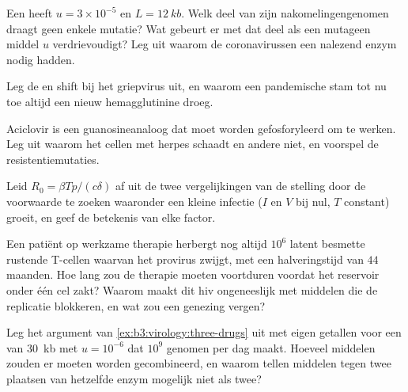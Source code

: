 \begin{exercise}[$\star\star$]\label{exo:b3:virology:7}
Een  heeft $u = 3\times 10^{-5}$ en $L = \qty{12}{kb}$. Welk
deel van zijn nakomelingengenomen draagt geen enkele mutatie? Wat
gebeurt er met dat deel als een mutageen middel $u$ verdrievoudigt? Leg
uit waarom de coronavirussen een nalezend enzym nodig hadden.
\end{exercise}

\begin{exercise}[$\star\star$]\label{exo:b3:virology:8}
Leg de  en shift bij het griepvirus uit, en waarom een
pandemische stam tot nu toe altijd een nieuw hemagglutinine droeg.
\end{exercise}

\begin{exercise}[$\star\star$]\label{exo:b3:virology:9}
Aciclovir is een guanosineanaloog dat moet worden gefosforyleerd om te
werken. Leg uit waarom het cellen met herpes schaadt en andere niet, en
voorspel de resistentiemutaties.
\end{exercise}

\begin{exercise}[$\star\star\star$]\label{exo:b3:virology:10}
Leid $R_{0} = \beta Tp/(c\delta)$ af uit de twee vergelijkingen van de
stelling door de voorwaarde te zoeken waaronder een kleine infectie
($I$ en $V$ bij nul, $T$ constant) groeit, en geef de betekenis van
elke factor.
\end{exercise}

\begin{exercise}[$\star\star\star$]\label{exo:b3:virology:11}
Een patiënt op werkzame therapie herbergt nog altijd $10^{6}$ latent
besmette rustende T-cellen waarvan het provirus zwijgt, met een
halveringstijd van $44$ maanden. Hoe lang zou de therapie moeten
voortduren voordat het reservoir onder één cel zakt? Waarom maakt dit
hiv ongeneeslijk met middelen die de replicatie blokkeren, en wat zou
een genezing vergen?
\end{exercise}

\begin{exercise}[$\star\star\star$]\label{exo:b3:virology:12}
Leg het argument van \cref{ex:b3:virology:three-drugs} uit met eigen
getallen voor een  van \qty{30}{kb} met $u = 10^{-6}$ dat $10^{9}$
genomen per dag maakt. Hoeveel middelen zouden er moeten worden
gecombineerd, en waarom tellen middelen tegen twee plaatsen van
hetzelfde enzym mogelijk niet als twee?
\end{exercise}

